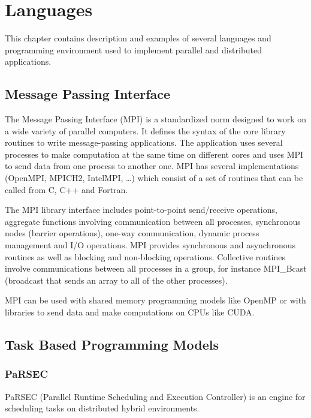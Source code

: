 \chapter{Languages}
\label{chap:languages}
\graphicspath{{chapters/languages/}}



This chapter contains description and examples of several languages and programming environment used to implement parallel and distributed applications.

\section{Message Passing Interface}
The Message Passing Interface (MPI) \cite{MPIForum} is a standardized norm designed to work on a wide variety of parallel computers.
It defines the syntax of the core library routines to write message-passing applications.
The application uses several processes to make computation at the same time on different cores and uses MPI to send data from one process to another one.
MPI has several implementations (OpenMPI, MPICH2, IntelMPI, \dots) which consist of a set of routines that can be called from C, C++ and Fortran.

The MPI library interface includes point-to-point send/receive operations, aggregate functions involving communication between all processes, synchronous nodes (barrier operations), one-way communication, dynamic process management and I/O operations.
MPI provides synchronous and asynchronous routines as well as blocking and non-blocking operations.
Collective routines involve communications between all processes in a group, for instance MPI\_Bcast (broadcast that sends an array to all of the other processes).

MPI can be used with shared memory programming models like OpenMP or with libraries to send data and make computations on CPUs like CUDA.


\section{Task Based Programming Models}
\subsection{PaRSEC}
PaRSEC \cite{BBDHL2011} \cite{BBDFH2013} (Parallel Runtime Scheduling and Execution Controller) is an engine for scheduling tasks on distributed hybrid environments.

